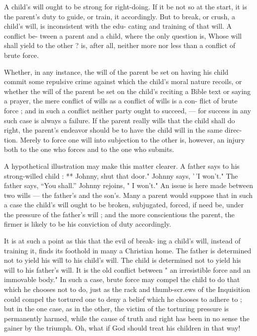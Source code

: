 \documentclass[
]{book}
\begin{document}
A child's will ought to be strong for right-doing. If it be not so at the start, it is the parent's duty to guide, or train, it accordingly. But to break, or crush, a child's will, is inconsistent with the edu- cating and training of that will. A conflict be- tween a parent and a child, where the only question is, Whose will shall yield to the other ? is, after all, neither more nor less than a conflict of brute force.

Whether, in any instance, the will of the parent be set on having his child commit some repulsive crime against which the child's moral nature recoils, or whether the will of the parent be set on the child's reciting a Bible text or saying a prayer, the mere conflict of wills as a conflict of wills is a con- flict of brute force ; and in such a conflict neither party ought to succeed, --- for success in any such case is always a failure. If the parent really wills that the child shall do right, the parent's endeavor should be to have the child will in the same direc- tion. Merely to force one will into subjection to the other is, however, an injury both to the one who forces and to the one who submits.

A hypothetical illustration may make this matter clearer. A father says to his strong-willed child : ** Johnny, shut that door." Johnny says, '\,'I won't." The father says, ``You shall.'' Johnny rejoins, " I won't." An issue is here made between two wills --- the father's and the son's. Many a parent would suppose that in such a case the child's will ought to be broken, subjugated, forced, if need be, under the pressure of the father's will ; and the more conscientious the parent, the firmer is likely to be his conviction of duty accordingly.

It is at such a point as this that the evil of break- ing a child's will, instead of training it, finds its foothold in many a Christian home. The father is determined not to yield his will to his child's will. The child is determined not to yield his will to his father's will. It is the old conflict between " an irresistible force and an immovable body." In such a case, brute force may compel the child to do that which he chooses not to do, just as the rack and thumb-scr.ews of the Inquisition could compel the tortured one to deny a belief which he chooses to adhere to ; but in the one case, as in the other, the victim of the torturing pressure is permanently harmed, while the cause of truth and right has been in no sense the gainer by the triumph. Oh, what if God should treat his children in that way!
\end{document}
